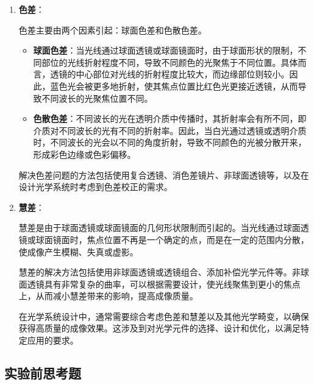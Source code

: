 \documentclass[dvipsnames, svgnames,a4paper,11pt]{article}
\begin{document}
\begin{enumerate}
    \item \textbf{色差}：
    
    色差主要由两个因素引起：球面色差和色散色差。
    
    \begin{itemize}
        \item \textbf{球面色差}：当光线通过球面透镜或球面镜面时，由于球面形状的限制，不同部位的光线折射程度不同，导致不同颜色的光聚焦于不同位置。具体而言，透镜的中心部位对光线的折射程度比较大，而边缘部位则较小。因此，蓝色光会被更多地折射，使其焦点位置比红色光更接近透镜，从而导致不同波长的光聚焦位置不同。
        
        \item \textbf{色散色差}：不同波长的光在透明介质中传播时，其折射率会有所不同，即介质对不同波长的光有不同的折射率。因此，当白光通过透镜或透明介质时，不同波长的光会以不同的角度折射，导致不同颜色的光被分散开来，形成彩色边缘或色彩偏移。
    \end{itemize}
    
    解决色差问题的方法包括使用复合透镜、消色差镜片、非球面透镜等，以及在设计光学系统时考虑到色差校正的需求。
    
    \item \textbf{慧差}：
    
    慧差是由于球面透镜或球面镜面的几何形状限制而引起的。当光线通过球面透镜或球面镜面时，焦点位置不再是一个确定的点，而是在一定的范围内分散，使成像产生模糊、失真或虚影。
    
    慧差的解决方法包括使用非球面透镜或透镜组合、添加补偿光学元件等。非球面透镜具有非常复杂的曲率，可以根据需要设计，使光线聚焦到更小的焦点上，从而减小慧差带来的影响，提高成像质量。
    
在光学系统设计中，通常需要综合考虑色差和慧差以及其他光学畸变，以确保获得高质量的成像效果。这涉及到对光学元件的选择、设计和优化，以满足特定应用的要求。

\end{enumerate}



	
	
	
	\subsection{实验前思考题}
	
\end{document}
